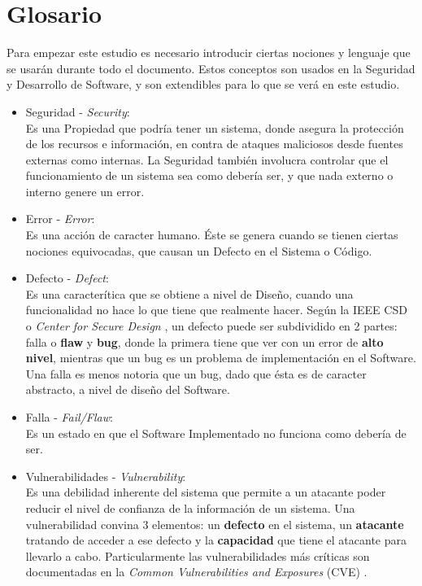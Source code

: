 \chapter{Glosario}
\label{Glosario}

Para empezar este estudio es necesario introducir ciertas nociones y lenguaje que se usarán durante todo el documento. Estos conceptos son usados en la Seguridad y Desarrollo de Software, y son extendibles para lo que se verá en este estudio.

\begin{itemize}
    \item Seguridad - \textit{Security}:
        \\Es una Propiedad que podría tener un sistema, donde asegura la protección de los recursos e información, en contra de ataques maliciosos desde fuentes externas como internas. La Seguridad también involucra controlar que el funcionamiento de un sistema sea como debería ser, y que nada externo o interno genere un error.
    \item Error - \textit{Error}:
        \\Es una acción de caracter humano. Éste se genera cuando se tienen ciertas nociones equivocadas, que causan un Defecto en el Sistema o Código.
    \item Defecto  - \textit{Defect}:
        \\Es una caracterítica que se obtiene a nivel de Diseño, cuando una funcionalidad no hace lo que tiene que realmente hacer. Según la IEEE CSD o \textit{Center for Secure Design} \cite{ieeecsd2}, un defecto puede ser subdividido en 2 partes: falla o \textbf{flaw} y \textbf{bug}, donde la primera tiene que ver con un error de \textbf{alto nivel}, mientras que un bug es un problema de implementación en el Software. Una falla es menos notoria que un bug, dado que ésta es de caracter abstracto, a nivel de diseño del Software.
    \item Falla - \textit{Fail/Flaw}:
        \\Es un estado en que el Software Implementado no funciona como debería de ser.
    \item Vulnerabilidades - \textit{Vulnerability}:
        \\Es una debilidad inherente del sistema que permite a un atacante poder reducir el nivel de confianza de la información de un sistema. Una vulnerabilidad convina 3 elementos: un \textbf{defecto} en el sistema, un \textbf{atacante} tratando de acceder a ese defecto y la \textbf{capacidad} que tiene el atacante para llevarlo a cabo. Particularmente las vulnerabilidades más críticas son documentadas en la \textit{Common Vulnerabilities and Exposures} (CVE) \cite{cve}.

\end{itemize}
